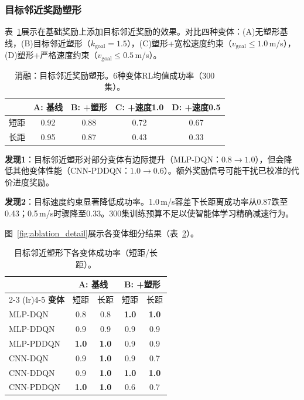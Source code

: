 \documentclass[conference]{IEEEtran}
\begin{document}
\subsubsection{目标邻近奖励塑形}

表~\ref{tab:ablation_shaping}展示在基础奖励上添加目标邻近奖励的效果。对比四种变体：(A)无塑形基线，(B)目标邻近塑形（$k_{\text{goal}} = 1.5$），(C)塑形+宽松速度约束（$v_{\text{goal}} \leq 1.0$\,m/s），(D)塑形+严格速度约束（$v_{\text{goal}} \leq 0.5$\,m/s）。

\begin{table}[t]
\centering
\caption{消融：目标邻近奖励塑形。6种变体RL均值成功率（300集）。}
\label{tab:ablation_shaping}
\footnotesize
\begin{tabular}{@{}lcccc@{}}
\toprule
& \textbf{A: 基线} & \textbf{B: +塑形} & \textbf{C: +速度1.0} & \textbf{D: +速度0.5} \\
\midrule
短距 & 0.92 & 0.88 & 0.72 & 0.67 \\
长距 & 0.95 & 0.87 & 0.43 & 0.33 \\
\bottomrule
\end{tabular}
\end{table}

\textbf{发现1}：目标邻近塑形对部分变体有边际提升（MLP-DQN：$0.8 \to 1.0$），但会降低其他变体性能（CNN-PDDQN：$1.0 \to 0.6$）。额外奖励信号可能干扰已校准的代价进度奖励。

\textbf{发现2}：目标速度约束显著降低成功率。1.0\,m/s容差下长距离成功率从0.87跌至0.43；0.5\,m/s时骤降至0.33。300集训练预算不足以使智能体学习精确减速行为。

图~\ref{fig:ablation_detail}展示各变体细分结果（表~\ref{fig:ablation_detail_tbl}）。

\begin{table}[t]
\centering
\caption{目标邻近塑形下各变体成功率（短距/长距）。}
\label{fig:ablation_detail_tbl}
\footnotesize
\begin{tabular}{@{}l cc cc@{}}
\toprule
& \multicolumn{2}{c}{\textbf{A: 基线}} & \multicolumn{2}{c}{\textbf{B: +塑形}} \\
\cmidrule(lr){2-3} \cmidrule(lr){4-5}
\textbf{变体} & 短距 & 长距 & 短距 & 长距 \\
\midrule
MLP-DQN    & 0.8 & 0.8 & \textbf{1.0} & \textbf{1.0} \\
MLP-DDQN   & 0.9 & 0.9 & 0.9 & 0.9 \\
MLP-PDDQN  & \textbf{1.0} & \textbf{1.0} & 0.9 & 0.9 \\
CNN-DQN    & 0.9 & \textbf{1.0} & 0.9 & 0.7 \\
CNN-DDQN   & 0.9 & \textbf{1.0} & \textbf{1.0} & \textbf{1.0} \\
CNN-PDDQN  & \textbf{1.0} & \textbf{1.0} & 0.6 & 0.7 \\
\bottomrule
\end{tabular}
\end{table}
\end{document}
